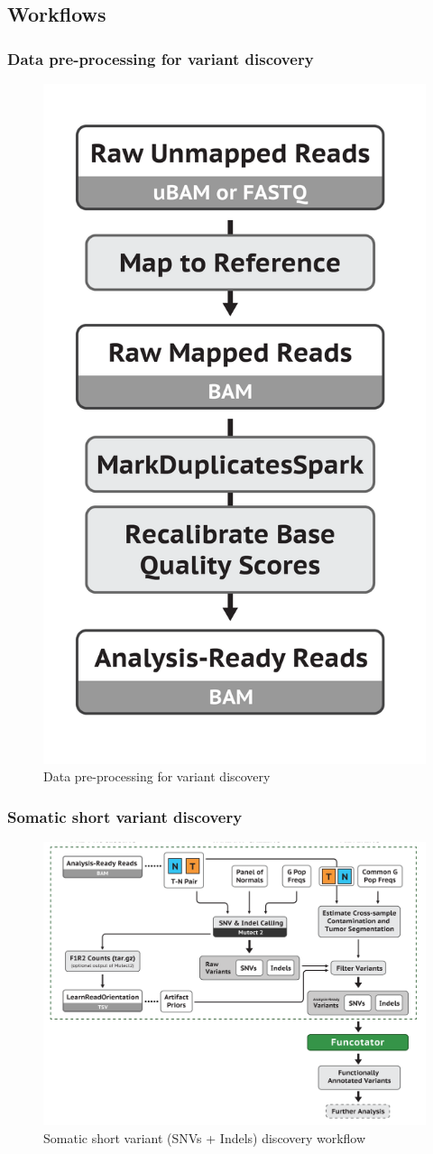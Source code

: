 \documentclass{beamer}
\begin{document}
    \subsection{Workflows}
    \begin{frame}
        \frametitle{Data pre-processing for variant discovery}

        \begin{figure}
            \includegraphics[width=0.3 \linewidth]{figures/Workflow/mapping.png}
            \caption{Data pre-processing for variant discovery \protect\cite{gatk1, gatk2}}
        \end{figure}
    \end{frame}

    \begin{frame}
        \frametitle{Somatic short variant discovery}

        \begin{figure}
            \includegraphics[width=0.7 \linewidth]{figures/Workflow/somatic_short_variants.png}
            \caption{Somatic short variant (SNVs + Indels) discovery workflow \protect\cite{gatk1, gatk2}}
        \end{figure}
    \end{frame}
\end{document}
